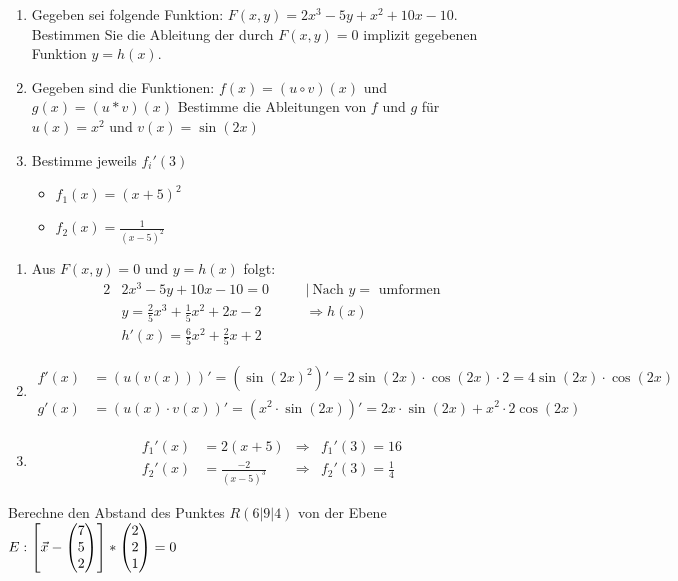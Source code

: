 \begin{enumerate}
	\item Gegeben sei folgende Funktion: $F(x,y)=2x^3-5y+x^2+10x-10$. Bestimmen Sie die Ableitung der durch $F(x,y)=0$ implizit gegebenen Funktion $y=h(x)$.
	\item Gegeben sind die Funktionen:
	$f(x) = (u \circ v)(x)$ und $g(x) = (u* v)(x)$
	Bestimme die Ableitungen von $f$ und $g$ für $u(x)=x^2$ und $v(x)=\sin(2x)$
	\item Bestimme jeweils $f_i'(3)$
	\begin{itemize}
		\item $f_1(x) = (x+5)^2$
		\item $f_2(x) = \frac{1}{(x-5)^2}$
	\end{itemize}
\end{enumerate}
\begin{lsg}{}
	\begin{enumerate}
		\item Aus $F(x,y)=0$ und $y=h(x)$ folgt:\begin{alignat*}{2}
		&2x^3-5y+10x-10=0\quad&&|\ \text{Nach $y=$ umformen}\\
		&y=\frac{2}{5} x^3+\frac{1}{5} x^2+2x-2 &&\Rightarrow h(x)\\
		&h'(x)=\frac{6}{5} x^2+\frac{2}{5}x+2
		\end{alignat*}
		\item \begin{align*}
		f'(x)&=\left(u(v(x))\right)'=\left({\sin(2x)}^2\right)'=2\sin(2x)\cdot \cos(2x) \cdot 2=4\sin(2x)\cdot \cos(2x)\\
		g'(x)&=(u(x)\cdot v(x))'=\left(x^2\cdot \sin(2x)\right)'=2x\cdot \sin(2x)+x^2\cdot 2\cos(2x)
		\end{align*}
		\item \begin{align*}
		f_1'(x)&=2(x+5)&\Rightarrow  &f_1'(3)=16\\
		f_2'(x)&=\frac{-2}{(x-5)^3}&\Rightarrow &f_2'(3)=\frac{1}{4}
		\end{align*}
	\end{enumerate}
\end{lsg}


Berechne den Abstand des Punktes $R(6|9|4)$ von der Ebene $E: \left[ \vec x -  \begin{pmatrix} 7 \\ 5\\ 2 \end{pmatrix}\right]*\begin{pmatrix} 2\\ 2 \\1 \end{pmatrix}=0$









